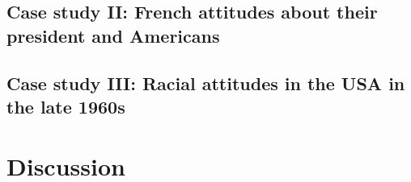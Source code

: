 \documentclass[11pt,letterpaper]{article}
\begin{document}
\subsection{Case study II: French attitudes about their president and Americans}



\subsection{Case study III: Racial attitudes in the USA in the late 1960s}


\section{Discussion}
\end{document}
